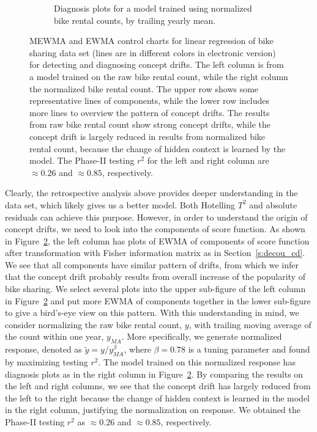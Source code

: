 \documentclass[twoside,11pt]{article}
\begin{document}
\begin{figure}[!htbp]
\begin{subfigure}[t]{0.4\linewidth}
\begin{subfigure}[t]{\linewidth}
     \end{subfigure}
     \caption{Diagnosis plots for a model trained using normalized bike rental counts, by trailing yearly mean.}
     \label{fig:bs_norm_cnt}
\end{subfigure}
  \caption{
  MEWMA and EWMA control charts for linear regression of bike sharing data set (lines are in different colors in electronic version) for detecting and diagnosing concept drifts. The left column is from a model trained on the raw bike rental count, while the right column the normalized bike rental count. The upper row shows some representative lines of components, while the lower row includes more lines to overview the pattern of concept drifts. The results from raw bike rental count show strong concept drifts, while the concept drift is largely reduced in results from normalized bike rental count, because the change of hidden context is learned by the model. The Phase-II testing $r^2$ for the left and right column are $\approx0.26$ and $\approx0.85$, respectively.
}
\label{fig:bike_sharing_diag}
\end{figure}

Clearly, the retrospective analysis above provides deeper understanding in the data set, which likely gives us a better model. Both Hotelling $T^2$ and absolute residuals can achieve this purpose. However, in order to understand the origin of concept drifts, we need to look into the components of score function. As shown in Figure~\ref{fig:bike_sharing_diag}, the left column has plots of EWMA of components of score function after transformation with Fisher information matrix as in Section~\ref{s:decou_cd}. We see that all components have similar pattern of drifts, from which we infer that the concept drift probably results from overall increase of the popularity of bike sharing. We select several plots into the upper sub-figure of the left column in Figure~\ref{fig:bike_sharing_diag} and put more EWMA of components together in the lower sub-figure to give a bird's-eye view on this pattern. With this understanding in mind, we consider normalizing the raw bike rental count, $y$, with trailing moving average of the count within one year, $y_{MA}$. More specifically, we generate normalized response, denoted as $\tilde{y}=y/y_{MA}^\beta$, where $\beta=0.78$ is a tuning parameter and found by maximizing testing $r^2$. The model trained on this normalized response has diagnosis plots as in the right column in Figure~\ref{fig:bike_sharing_diag}. By comparing the results on the left and right columns, we see that the concept drift has largely reduced from the left to the right because the change of hidden context is learned in the model in the right column, justifying the normalization on response. We obtained the Phase-II testing $r^2$ as $\approx0.26$ and $\approx0.85$, respectively.
\end{document}
